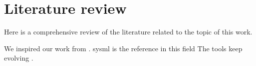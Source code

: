 \chapter{Literature review}

\label{cap:background}

Here is a comprehensive review of the literature related to the topic of this work.

We inspired our work from \citet{Chakrabarti2014}.
\acrshort{sysml} is the reference in this field \citep{ObjectManagementGroup2015}
The tools keep evolving \citep{Skoltech2017}.

